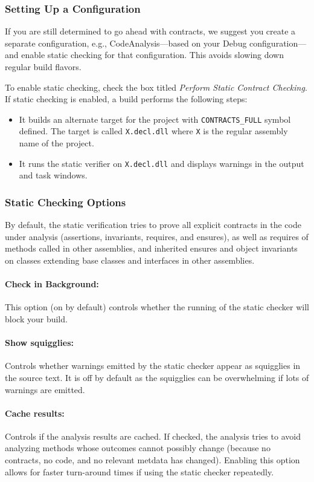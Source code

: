 \documentclass{article}
\newcommand{\code}[1]{\lstinline{#1}}
\begin{document}
\subsubsection{Setting Up a Configuration}
If you are still determined to go ahead with contracts, we suggest you
create a separate configuration, e.g., CodeAnalysis---based on your
Debug configuration---and enable static checking for that
configuration. This avoids slowing down regular build flavors. 

To enable static checking, check the box titled \textit{Perform Static
Contract Checking}. If static checking is enabled, a build performs
the following steps:
\begin{itemize}
\item It builds an alternate target for the project with
\code{CONTRACTS_FULL} symbol defined. The target is called
\code{X.decl.dll} where \code{X} is the regular assembly name of the
project.
\item It runs the static verifier on \code{X.decl.dll} and displays warnings in the output and task windows.
\end{itemize}

\subsubsection{Static Checking Options}
\label{sec:staticcheckingoptions}
By default, the static verification tries to prove all explicit
contracts in the code under analysis (assertions, invariants,
requires, and ensures), as well as requires of methods called in other
assemblies, and inherited ensures and object invariants on classes
extending base classes and interfaces in other assemblies.

\paragraph{Check in Background:} This option (on by default) controls
whether the running of the static checker will block your
build.

\paragraph{Show squigglies:} Controls whether warnings emitted by the
static checker appear as squigglies in the source text. It is off by
default as the squigglies can be overwhelming if lots of warnings are
emitted.

\paragraph{Cache results:} Controls if the analysis results are
cached. If checked, the analysis tries to avoid analyzing methods
whose outcomes cannot possibly change (because no contracts, no code,
and no relevant metdata has changed). Enabling this option allows for
faster turn-around times if using the static checker repeatedly.
\end{document}
